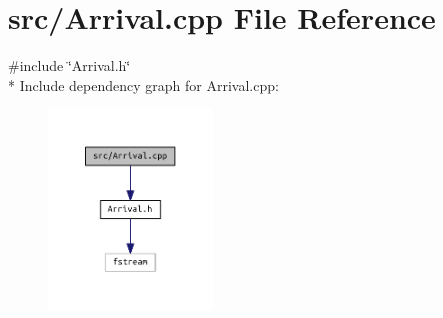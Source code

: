 \section{src/\+Arrival.cpp File Reference}
\label{_arrival_8cpp}
{\ttfamily \#include \char`\"{}Arrival.\+h\char`\"{}}\\*
Include dependency graph for Arrival.\+cpp\+:
\nopagebreak
\begin{figure}[H]
\begin{center}
\leavevmode
\includegraphics[width=124pt]{_arrival_8cpp__incl}
\end{center}
\end{figure}
